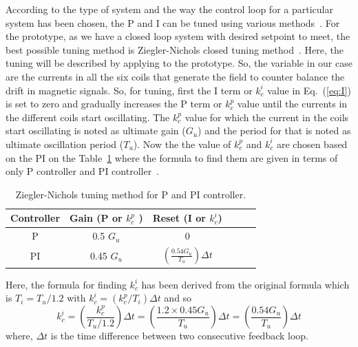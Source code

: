 According to the type of system and the way the control loop for a particular system has been chosen, the P and I can be tuned using various methods~\cite{tuning}. For the prototype, as we have a closed loop system with desired setpoint to meet, the best possible tuning method is Ziegler-Nichols closed tuning method~\cite{tuning_ZN}. Here, the tuning will be described by applying to the prototype. So, the variable in our case are the currents in all the six coils that generate the field to counter balance the drift in magnetic signals. So, for tuning, first the I term or $k_c^i$ value in Eq.~(\ref{eq:I}) is set to zero and gradually increases the P term or $k_c^p$ value until the currents in the different coils start oscillating. The $k_c^p$ value for which the current in the coils start oscillating is noted as ultimate gain ($G_{u}$) and the period for that is noted as ultimate oscillation period ($T_u$). Now the the value of $k_c^p$ and $k_c^i$ are chosen based on the PI on the Table~\ref{table:tuning} where the formula to find them are given in terms of only P controller and PI controller~\cite{tuning_formula}. 

\begin{table} [htb!]
    \centering
    \begin{tabular} { |c|c|c|c|c|c|} 
        \hline
        Controller & Gain (P or $k_c^p$ ) & Reset (I or $k_c^i$)\\
        \hline\hline
         P & 0.5 $G_u$ & 0 \\ 
        \hline
         PI & 0.45 $G_u$ & $\left(\frac{\text{0.54} G_u}{T_u}\right)\Delta t$ \\ 
        \hline
    \end{tabular}
    \caption{Ziegler-Nichols tuning method for P and PI controller. }\label{table:tuning}
\end{table}

\FloatBarrier
Here, the formula for finding $k_c^i$ has been derived from the original formula which is $T_i=T_u/1.2$ with $k_c^i=(k_c^p/T_i)\Delta t$ and so
\begin{equation}
    k_c^i=\left(\frac{k_c^p}{T_u/1.2}\right)\Delta t=\left(\frac{1.2\times0.45 G_u}{T_u}\right)\Delta t=\left(\frac{0.54 G_u}{T_u}\right)\Delta t
\end{equation}
where, $\Delta t$ is the time difference between two consecutive feedback loop.


